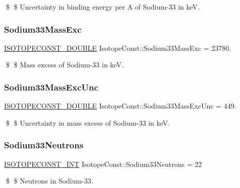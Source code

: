 \$ \$ Uncertainty in binding energy per A of Sodium-\/33 in keV. \mbox{\label{group___isotope_const-_sodium-_na33_ga557082b27c355996ef398139b4805247}} 
\subsubsection{\texorpdfstring{Sodium33\+Mass\+Exc}{Sodium33MassExc}}
{\footnotesize\ttfamily \mbox{\hyperlink{group___isotope_const-_macros_ga8f45a7272ce02c0b4c65c44636ed719a}{I\+S\+O\+T\+O\+P\+E\+C\+O\+N\+S\+T\+\_\+\+D\+O\+U\+B\+LE}} Isotope\+Const\+::\+Sodium33\+Mass\+Exc = 23780.}

\$ \$ Mass excess of Sodium-\/33 in keV. \mbox{\label{group___isotope_const-_sodium-_na33_ga271fd7c8ce68456625e010b3bd67ccd2}} 
\subsubsection{\texorpdfstring{Sodium33\+Mass\+Exc\+Unc}{Sodium33MassExcUnc}}
{\footnotesize\ttfamily \mbox{\hyperlink{group___isotope_const-_macros_ga8f45a7272ce02c0b4c65c44636ed719a}{I\+S\+O\+T\+O\+P\+E\+C\+O\+N\+S\+T\+\_\+\+D\+O\+U\+B\+LE}} Isotope\+Const\+::\+Sodium33\+Mass\+Exc\+Unc = 449.}

\$ \$ Uncertainty in mass excess of Sodium-\/33 in keV. \mbox{\label{group___isotope_const-_sodium-_na33_gaba3bf871bbc3e0149e76d9a8d4aab733}} 
\subsubsection{\texorpdfstring{Sodium33\+Neutrons}{Sodium33Neutrons}}
{\footnotesize\ttfamily \mbox{\hyperlink{group___isotope_const-_macros_ga5f18360b3e99483a35c32d789e62621c}{I\+S\+O\+T\+O\+P\+E\+C\+O\+N\+S\+T\+\_\+\+I\+NT}} Isotope\+Const\+::\+Sodium33\+Neutrons = 22}

\$ \$ Neutrons in Sodium-\/33. \mbox{\label{group___isotope_const-_sodium-_na33_ga53b22ed5619a64d61d093c8633f62336}} 
